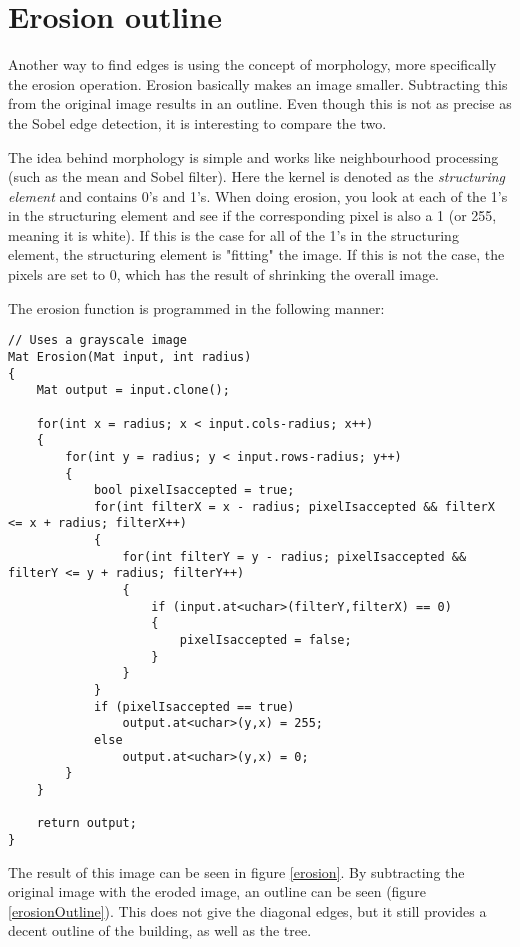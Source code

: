 \section{Erosion outline}
Another way to find edges is using the concept of morphology, more specifically the erosion operation. Erosion basically makes an image smaller. Subtracting this from the original image results in an outline. Even though this is not as precise as the Sobel edge detection, it is interesting to compare the two.

The idea behind morphology is simple and works like neighbourhood processing (such as the mean and Sobel filter). Here the kernel is denoted as the \textit{structuring element} and contains 0's and 1's. When doing erosion, you look at each of the 1's in the structuring element and see if the corresponding pixel is also a 1 (or 255, meaning it is white). If this is the case for all of the 1's in the structuring element, the structuring element is "fitting" the image. If this is not the case, the pixels are set to 0, which has the result of shrinking the overall image. \citep{ip_book}

The erosion function is programmed in the following manner:

\begin{lstlisting}
// Uses a grayscale image
Mat Erosion(Mat input, int radius)
{
	Mat output = input.clone();

	for(int x = radius; x < input.cols-radius; x++)
	{
		for(int y = radius; y < input.rows-radius; y++)
		{
			bool pixelIsaccepted = true;
			for(int filterX = x - radius; pixelIsaccepted && filterX <= x + radius; filterX++)
			{
				for(int filterY = y - radius; pixelIsaccepted && filterY <= y + radius; filterY++)
				{
					if (input.at<uchar>(filterY,filterX) == 0)
					{
						pixelIsaccepted = false;
					}
				}
			}
			if (pixelIsaccepted == true)
				output.at<uchar>(y,x) = 255;
			else
				output.at<uchar>(y,x) = 0;
		}
	}

	return output;
}
\end{lstlisting}

The result of this image can be seen in figure \ref{erosion}. By subtracting the original image with the eroded image, an outline can be seen (figure \ref{erosionOutline}). This does not give the diagonal edges, but it still provides a decent outline of the building, as well as the tree.

